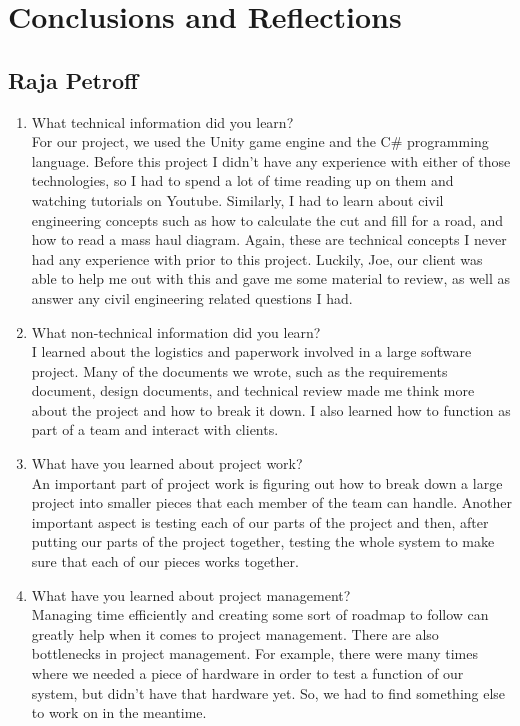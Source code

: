 \documentclass[onecolumn, draftclsnofoot,10pt, compsoc]{IEEEtran}
\def \GroupMemberOne{			Raja Petroff			}
\begin{document}
\section{Conclusions and Reflections}
\subsection{\GroupMemberOne}
\begin{enumerate}
\item What technical information did you learn?\\
For our project, we used the Unity game engine and the C\# programming language. Before this project I didn't have any experience with either of those technologies, so I had to spend a lot of time reading up on them and watching tutorials on Youtube. Similarly, I had to learn about civil engineering concepts such as how to calculate the cut and fill for a road, and how to read a mass haul diagram. Again, these are technical concepts I never had any experience with prior to this project. Luckily, Joe, our client was able to help me out with this and gave me some material to review, as well as answer any civil engineering related questions I had.
\item What non-technical information did you learn?\\
I learned about the logistics and paperwork involved in a large software project. Many of the documents we wrote, such as the requirements document, design documents, and technical review made me think more about the project and how to break it down. I also learned how to function as part of a team and interact with clients.
\item What have you learned about project work?\\
An important part of project work is figuring out how to break down a large project into smaller pieces that each member of the team can handle. Another important aspect is testing each of our parts of the project and then, after putting our parts of the project together, testing the whole system to make sure that each of our pieces works together.  
\item What have you learned about project management?\\
Managing time efficiently and creating some sort of roadmap to follow can greatly help when it comes to project management. There are also bottlenecks in project management. For example, there were many times where we needed a piece of hardware in order to test a function of our system, but didn't have that hardware yet. So, we had to find something else to work on in the meantime.

\end{enumerate}
\end{document}
